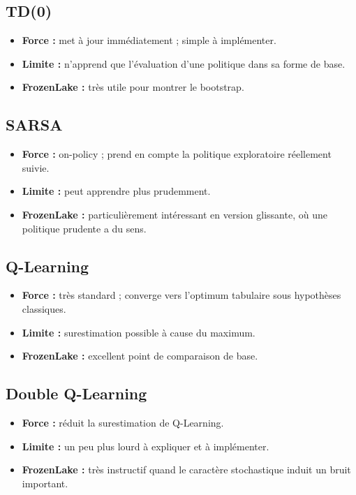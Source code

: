 \documentclass[11pt,a4paper]{article}
\begin{document}
\subsection{TD(0)}

\begin{itemize}[leftmargin=1.6em]
    \item \textbf{Force :} met à jour immédiatement ; simple à implémenter.
    \item \textbf{Limite :} n'apprend que l'évaluation d'une politique dans sa forme de base.
    \item \textbf{FrozenLake :} très utile pour montrer le bootstrap.
\end{itemize}

\subsection{SARSA}

\begin{itemize}[leftmargin=1.6em]
    \item \textbf{Force :} on-policy ; prend en compte la politique exploratoire réellement suivie.
    \item \textbf{Limite :} peut apprendre plus prudemment.
    \item \textbf{FrozenLake :} particulièrement intéressant en version glissante, où une politique prudente a du sens.
\end{itemize}

\subsection{Q-Learning}

\begin{itemize}[leftmargin=1.6em]
    \item \textbf{Force :} très standard ; converge vers l'optimum tabulaire sous hypothèses classiques.
    \item \textbf{Limite :} surestimation possible à cause du maximum.
    \item \textbf{FrozenLake :} excellent point de comparaison de base.
\end{itemize}

\subsection{Double Q-Learning}

\begin{itemize}[leftmargin=1.6em]
    \item \textbf{Force :} réduit la surestimation de Q-Learning.
    \item \textbf{Limite :} un peu plus lourd à expliquer et à implémenter.
    \item \textbf{FrozenLake :} très instructif quand le caractère stochastique induit un bruit important.
\end{itemize}
\end{document}
